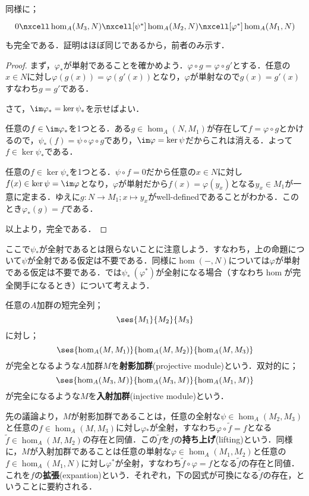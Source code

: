 同様に；
\[\begin{tikzcd}
0\nxcell\hom_A(M_3,N)\nxcell[\psi^\ast]\hom_A(M_2,N)\nxcell[\varphi^\ast]\hom_A(M_1,N)
\end{tikzcd}\]
も完全である．証明はほぼ同じであるから，前者のみ示す．
\begin{proof}
	まず，$\varphi_\ast $が単射であることを確かめよう．$\varphi\circ g=\varphi\circ g'$とする．任意の$x\in N$に対し$\varphi(g(x))=\varphi(g'(x))$となり，$\varphi$が単射なので$g(x)=g'(x)$すなわち$g=g'$である．
	
	さて，$\im\varphi_\ast =\ker\psi_\ast $を示せばよい．
	\begin{mrkw}
		\item 
		任意の$f\in\im\varphi_\ast$を1つとる．ある$g\in\hom_A(N,M_1)$が存在して$f=\varphi\circ g$とかけるので，$\psi_\ast (f)=\psi\circ\varphi\circ g$であり，$\im\varphi=\ker\psi$だからこれは消える．よって$f\in\ker\psi_\ast $である．
		\item 
		任意の$f\in\ker\psi_\ast $を1つとる．$\psi\circ f=0$だから任意の$x\in N$に対し$f(x)\in\ker\psi=\im\varphi$となり，$\varphi$が単射だから$f(x)=\varphi(y_x)$となる$y_x\in M_1$が一意に定まる．ゆえに$g:N\to M_1;x\mapsto y_x$がwell-definedであることがわかる．このとき$\varphi_\ast (g)=f$である．
	\end{mrkw}
	以上より，完全である．
\end{proof}

ここで$\psi_\ast $が全射であるとは限らないことに注意しよう．すなわち，上の命題について$\psi$が全射である仮定は不要である．同様に$\hom(-,N)$については$\varphi$が単射である仮定は不要である．では$\psi_\ast~(\varphi^\ast)$が全射になる場合（すなわち$\hom$が完全関手になるとき）について考えよう．
\begin{defi}
	任意の$A$加群の短完全列；
	\[\ses{M_1}{M_2}{M_3}\]
	に対し；
	\[\ses{\hom_A(M,M_1)}{\hom_A(M,M_2)}{\hom_A(M,M_3)}\]
	が完全となるような$A$加群$M$を\textbf{射影加群}(projective module)という．双対的に；
	\[\ses{\hom_A(M_3,M)}{\hom_A(M_3,M)}{\hom_A(M_1,M)}\]
	が完全になるような$M$を\textbf{入射加群}(injective module)という．
\end{defi}

先の議論より，$M$が射影加群であることは，任意の全射な$\psi\in\hom_A(M_2,M_3)$と任意の$f\in\hom_A(M,M_3)$に対し$\varphi{}_\ast $が全射，すなわち$\varphi\circ\widetilde{f}=f$となる$\widetilde{f}\in\hom_A(M,M_2)$の存在と同値．この$\widetilde{f}$を$f$の\textbf{持ち上げ}(lifting)という．同様に，$M$が入射加群であることは任意の単射な$\varphi\in\hom_A(M_1,M_2)$と任意の$f\in\hom_A(M_1,N)$に対し$\varphi^\ast $が全射，すなわち$\widetilde{f}\circ\varphi=f$となる$\widetilde{f}$の存在と同値．これを$f$の\textbf{拡張}(expantion)という．それぞれ，下の図式が可換になる$\widetilde{f}$の存在，ということに要約される．

